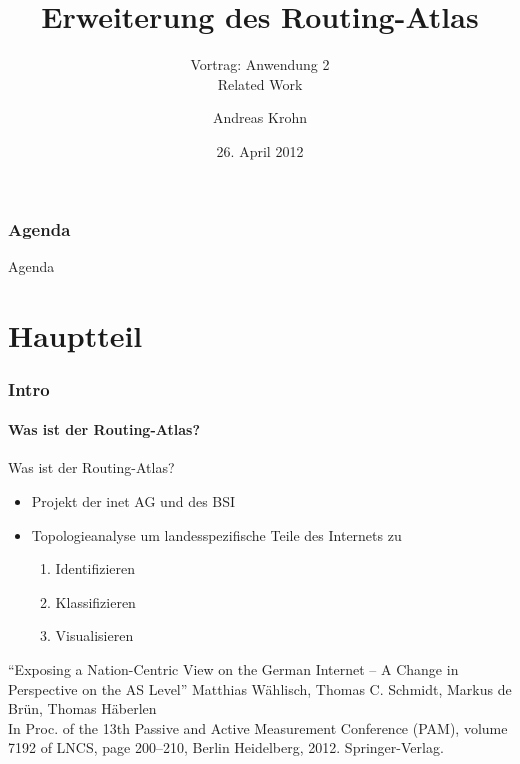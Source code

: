 \documentclass[ngerman,compress,hyperref={bookmarks}]{beamer}
\title{Erweiterung des Routing-Atlas}
\subtitle{Vortrag: Anwendung 2\\ Related Work}
\author{Andreas Krohn}
\institute[HAW]{Hochschule für Angewandte Wissenschaften Hamburg}
\date[SoSe 2012]{26. April 2012}
\begin{document}
\frame[plain]{\titlepage}

\section*{Agenda}
\begin{frame}{Agenda} \setcounter{tocdepth}{1} \tableofcontents[part=1] \setcounter{tocdepth}{3} \end{frame}

\part{Hauptteil}
\section{Intro}

\subsection{Was ist der Routing-Atlas?}
\begin{frame}{Was ist der Routing-Atlas?}
\nocite{wsbh-envgi-12}
  \begin{itemize}
    \item Projekt der inet AG und des BSI
    \item Topologieanalyse um landesspezifische Teile des Internets zu
    \begin{enumerate}
      \item Identifizieren
      \item Klassifizieren
      \item Visualisieren
    \end{enumerate}
  \end{itemize}
  \vspace{0.1cm}
  {\small
  \begin{thebibliography}{}
     ``Exposing a Nation-Centric View on the German Internet – A Change in Perspective on the AS Level''
    \newblock Matthias Wählisch, Thomas C. Schmidt, Markus de Brün, Thomas Häberlen\\
    \newblock In Proc. of the 13th Passive and Active Measurement Conference (PAM), volume 7192 of LNCS, page 200–210, Berlin Heidelberg, 2012. Springer-Verlag.\\[-20pt]
  \end{thebibliography}
  }
\end{frame}
\end{document}
